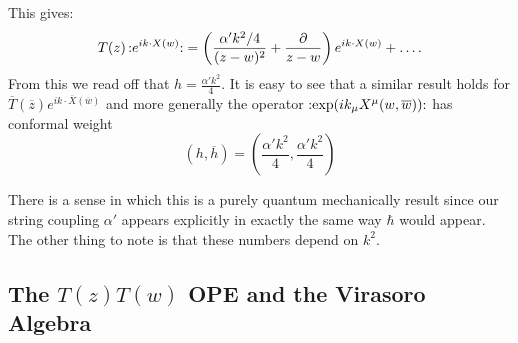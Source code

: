 This gives:
\begin{equation}
  T(z) \mathop{:}\nolimits\!e^{i k \cdot X (w)}\!\mathop{:}\nolimits = \left( \frac{\alpha' k^2 / 4}{(z - w)^2}  + \frac{\partial}{z - w}\right) e^{i k \cdot X(w)} + \dots.
\end{equation}
From this we read off that $h = \frac{\alpha' k^2}{4}$.
It is easy to see that a similar result holds for $ \overline{T}{}(\overline{z}{}) e^{i k \cdot \overline{X}{} (\overline{w}{})} $ and more generally the operator $ \mathop{:}\nolimits\! \exp(i k_{\mu} X^{\mu}(w, \overline{w}{}))\!\mathop{:}\nolimits $ has conformal weight
\begin{equation}
  \boxed{(h, \overline{h}{}) = \left( \frac{\alpha' k^2}{4}, \frac{\alpha' k^2}{4} \right)}
\end{equation}

There is a sense in which this is a purely quantum mechanically result since our string coupling $\alpha'$ appears explicitly in exactly the same way $\hbar$ would appear.
The other thing to note is that these numbers depend on $k^2$.

\subsection{The \texorpdfstring{$T(z) T(w)$}{TT} OPE and the Virasoro Algebra}%
\label{sub:the_tt_stress_ope_and_the_virasoro_algebra}


